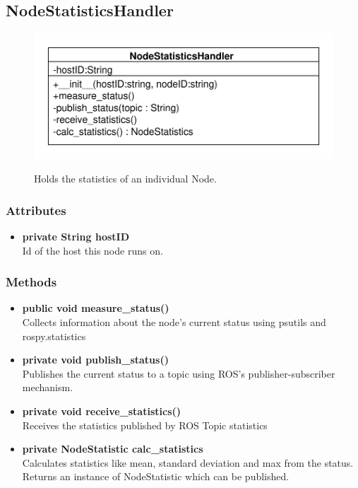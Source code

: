 \subsection{NodeStatisticsHandler}
\begin{figure}[htbp]
	\begin{minipage}[t]{7cm}
		\vspace{0pt}
		\centering
		\includegraphics[scale=0.6]{./diagram_pictures/NodeInterface/NodeStatisticsHandler.pdf}
	\end{minipage}
	\hfill
	\begin{minipage}[t]{6cm}
		\vspace{10pt}
		Holds the statistics of an individual Node.
	\end{minipage}
\end{figure}


\subsubsection{Attributes}
\begin{itemize}
	\item \textbf{private String hostID}\\
	Id of the host this node runs on.
\end{itemize}

\subsubsection{Methods}
\begin{itemize}
	\item \textbf{public void measure\_status()}\\
	Collects information about the node's current status using psutils and rospy.statistics
	\item \textbf{private void publish\_status()}\\
	Publishes the current status to a topic using ROS's publisher-subscriber mechanism.
	\item \textbf{private void receive\_statistics()}\\
	Receives the statistics published by ROS Topic statistics
	\item \textbf{private NodeStatistic calc\_statistics}\\
	Calculates statistics like mean, standard deviation and max from the status.
	Returns an instance of NodeStatistic which can be published.
\end{itemize}

